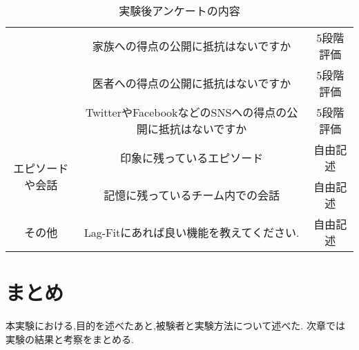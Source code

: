 \begin{table}[htbp]
\begin{center}
{\begin{tabular}{|c|c|c|}
	& 家族への得点の公開に抵抗はないですか &5段階評価\\
	& 医者への得点の公開に抵抗はないですか &5段階評価\\
	& TwitterやFacebookなどのSNSへの得点の公開に抵抗はないですか &5段階評価\\
	\hline
	\multirow{2}{*}{エピソードや会話} & 印象に残っているエピソード & 自由記述 \\
	& 記憶に残っているチーム内での会話 & 自由記述 \\ 
	\hline
	その他 & Lag-Fitにあれば良い機能を教えてください. & 自由記述 \\
	\hline
 	\end{tabular}
	}
 	\end{center}
 	\caption{実験後アンケートの内容}
 	\label{questionaire3}
\end{table}

\section{まとめ}
本実験における,目的を述べたあと,被験者と実験方法について述べた.
次章では実験の結果と考察をまとめる.
